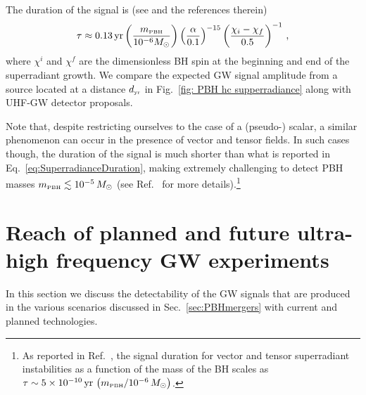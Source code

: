\documentclass[11pt,a4paper]{article}
\begin{document}
The duration of the signal is (see \cite{Brito:2015oca} and the references therein)
\begin{equation}
\label{eq:SuperradianceDuration}
	 \tau \approx 0.13 \,  {\rm yr} \left( {m_\text{\tiny PBH} \over 10^{-6}M_\odot} \right) 
	 \left( \alpha \over  0.1 \right)^{-15} \left( { {\chi_i - \chi_f} \over  0.5 } \right)^{-1} \,,
\end{equation}
where $\chi^{i}$ and $\chi^{f}$ are the dimensionless
BH spin at the beginning and end of the superradiant growth.
We compare the expected GW signal amplitude from a source located at a distance $d_\text{\tiny yr}$ in Fig.~\ref{fig: PBH hc supperradiance} along with UHF-GW detector proposals.


Note that, despite restricting ourselves to the case of a (pseudo-) scalar, a similar phenomenon can occur in the presence of vector and tensor fields. In such cases though, the duration of the signal is much shorter than what is reported in Eq.~\eqref{eq:SuperradianceDuration},
making extremely challenging to detect PBH masses $m_{\text{\tiny PBH}} \lesssim 10^{-5} \, M_\odot$ (see Ref.~\cite{Brito:2015oca} for more details).\footnote{As reported in Ref.~\cite{Brito:2015oca}, the signal duration for vector and tensor superradiant instabilities as a function of the mass of the BH scales as
$\tau \sim 5 \times 10^{-10} \, \text{yr} \, \left({m_{\text{\tiny{PBH}}}}/{10^{-6} \, M_\odot}\right)$.}





\section{Reach of planned and future ultra-high frequency GW experiments}
\label{sec:Detectors}

In this section we discuss the detectability of the GW signals that are produced in the various scenarios discussed in Sec.~\ref{sec:PBHmergers} with current and planned technologies.
\end{document}
